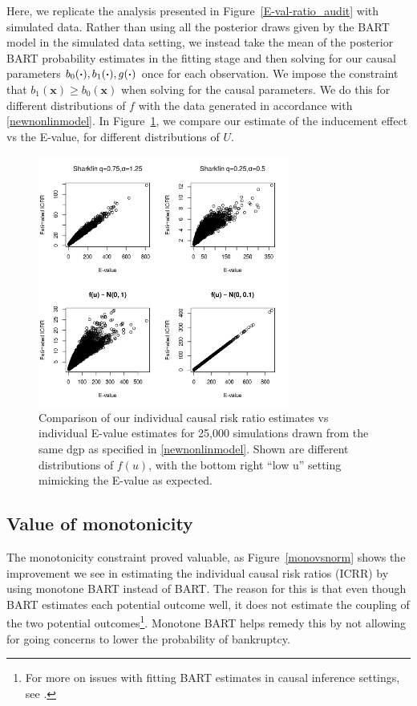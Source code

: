 \documentclass[aoas,preprint, 11pt, dvipsnames, table, x11name]{imsart}
\renewcommand{\bm}[1]{\mathbf{#1}}
\theoremstyle{remark}
\begin{document}
	
	Here, we replicate the analysis presented in Figure~\ref{E-val-ratio_audit} with simulated data.  Rather than using all the posterior draws given by the BART model in the simulated data setting, we instead take the mean of the posterior BART probability estimates in the fitting stage and then solving for our causal parameters $b_0(\vdot), b_1(\vdot), g(\vdot)$ once for each observation.  We impose the constraint that $b_1(\bm{x})\geq b_0(\bm{x})$ when solving for the causal parameters. We do this for different distributions of $f$ with the data generated in accordance with \ref{newnonlinmodel}.   In Figure~\ref{E-val-ratio}, we compare our estimate of the inducement effect vs the E-value, for different distributions of $U$.  
	\begin{figure}[h]
		\centering
		
		\includegraphics[height=8.25cm]{eval_vs_our_sim}
		
		\caption[E-val vs ratio]{  Comparison of our individual causal risk ratio estimates vs individual E-value estimates for 25,000 simulations drawn from the same dgp as specified in \ref{newnonlinmodel}.  Shown are different distributions of $f(u)$, with the bottom right ``low u'' setting mimicking the E-value as expected. }
		\label{E-val-ratio}
		
	\end{figure}
	
	\subsection{Value of monotonicity}\label{mono_section}
	The monotonicity constraint proved valuable, as Figure~\ref{monovsnorm} shows the improvement we see in estimating the individual causal risk ratios (ICRR) by using monotone BART instead of BART.  The reason for this is that even though BART estimates each potential outcome well, it does not estimate the coupling of the two potential outcomes\footnote{For more on issues with fitting BART estimates in causal inference settings, see \cite{bcf}.}.  Monotone BART helps remedy this by not allowing for going concerns to lower the probability of bankruptcy.  
	
\end{document}
